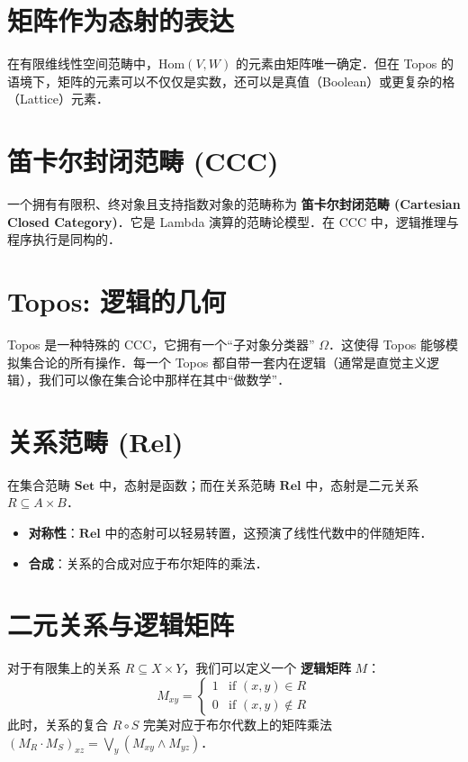 \documentclass[10pt, openany]{book}
\begin{document}
\section{矩阵作为态射的表达}
在有限维线性空间范畴中，$\mathrm{Hom}(V, W)$ 的元素由矩阵唯一确定．但在 Topos 的语境下，矩阵的元素可以不仅仅是实数，还可以是真值（Boolean）或更复杂的格（Lattice）元素．

\section{笛卡尔封闭范畴 (CCC)}
一个拥有有限积、终对象且支持指数对象的范畴称为 \textbf{笛卡尔封闭范畴 (Cartesian Closed Category)}．它是 Lambda 演算的范畴论模型．在 CCC 中，逻辑推理与程序执行是同构的．

\section{Topos: 逻辑的几何}
Topos 是一种特殊的 CCC，它拥有一个“子对象分类器” $\Omega$．这使得 Topos 能够模拟集合论的所有操作．每一个 Topos 都自带一套内在逻辑（通常是直觉主义逻辑），我们可以像在集合论中那样在其中“做数学”．

\section{关系范畴 (Rel)}
在集合范畴 $\mathbf{Set}$ 中，态射是函数；而在关系范畴 $\mathbf{Rel}$ 中，态射是二元关系 $R \subseteq A \times B$．
\begin{itemize}
    \item \textbf{对称性}：$\mathbf{Rel}$ 中的态射可以轻易转置，这预演了线性代数中的伴随矩阵．
    \item \textbf{合成}：关系的合成对应于布尔矩阵的乘法．
\end{itemize}

\section{二元关系与逻辑矩阵}
对于有限集上的关系 $R \subseteq X \times Y$，我们可以定义一个 \textbf{逻辑矩阵} $M$：
\begin{equation}
M_{xy} = \begin{cases} 1 & \text{if } (x, y) \in R \\ 0 & \text{if } (x, y) \notin R \end{cases}
\end{equation}
此时，关系的复合 $R \circ S$ 完美对应于布尔代数上的矩阵乘法 $(M_R \cdot M_S)_{xz} = \bigvee_y (M_{xy} \wedge M_{yz})$．
\end{document}
